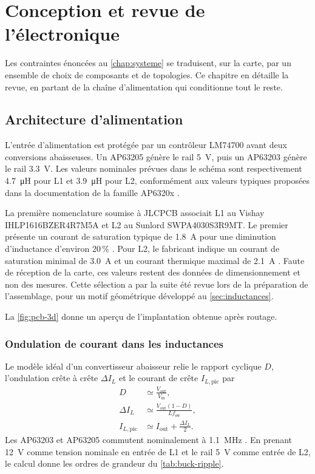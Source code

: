 \chapter{Conception et revue de l'électronique}
\label{chap:hardware}

Les contraintes énoncées au \cref{chap:systeme} se traduisent, sur la carte, par un ensemble de choix de composants et de topologies. Ce chapitre en détaille la revue, en partant de la chaîne d'alimentation qui conditionne tout le reste.

\section{Architecture d'alimentation}

L'entrée d'alimentation est protégée par un contrôleur LM74700 avant deux conversions abaisseuses. Un AP63205 génère le rail \SI{5}{\volt}, puis un AP63203 génère le rail \SI{3.3}{\volt}. Les valeurs nominales prévues dans le schéma sont respectivement \SI{4.7}{\micro\henry} pour L1 et \SI{3.9}{\micro\henry} pour L2, conformément aux valeurs typiques proposées dans la documentation de la famille AP6320x \cite{diodes-ap6320x}.

La première nomenclature soumise à JLCPCB associait L1 au Vishay IHLP1616\-BZER4R7M5A et L2 au Sunlord SWPA4030\-S3R9MT. Le premier présente un courant de saturation typique de \SI{1.8}{\ampere} pour une diminution d'inductance d'environ 20\,\% \cite{vishay-ihlp1616}. Pour L2, le fabricant indique un courant de saturation minimal de \SI{3.0}{\ampere} et un courant thermique maximal de \SI{2.1}{\ampere} \cite{sunlord-swpa}. Faute de réception de la carte, ces valeurs restent des données de dimensionnement et non des mesures. Cette sélection a par la suite été revue lors de la préparation de l'assemblage, pour un motif géométrique développé au \cref{sec:inductances}.

La \cref{fig:pcb-3d} donne un aperçu de l'implantation obtenue après routage.

\subsection{Ondulation de courant dans les inductances}

Le modèle idéal d'un convertisseur abaisseur relie le rapport cyclique $D$, l'ondulation crête à crête $\Delta I_L$ et le courant de crête $I_{L,\mathrm{pic}}$ par
\begin{align}
  D &\simeq \frac{V_{\mathrm{out}}}{V_{\mathrm{in}}}, \\
  \Delta I_L &\simeq
    \frac{V_{\mathrm{out}}\left(1-D\right)}{L f_{\mathrm{sw}}}, \\
  I_{L,\mathrm{pic}} &\simeq I_{\mathrm{out}} + \frac{\Delta I_L}{2}.
  \label{eq:buck-ripple}
\end{align}
Les AP63203 et AP63205 commutent nominalement à \SI{1.1}{\mega\hertz} \cite{diodes-ap6320x}. En prenant \SI{12}{\volt} comme tension nominale en entrée de L1 et le rail \SI{5}{\volt} comme entrée de L2, le calcul donne les ordres de grandeur du \cref{tab:buck-ripple}.

